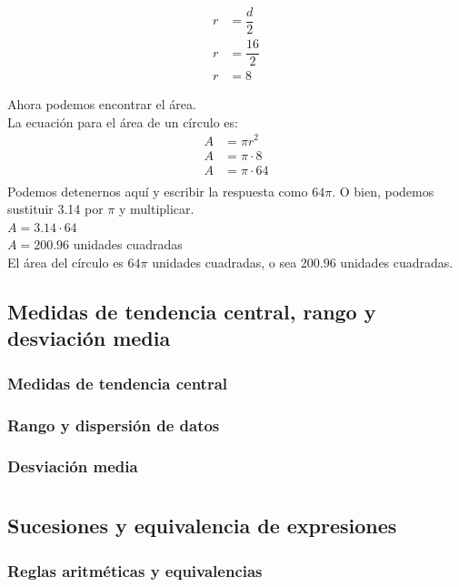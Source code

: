 \documentclass[11pt]{book}
\begin{document}
\begin{align*}
  r & = \dfrac d2     \\
  r & = \dfrac{16}{2} \\
  r & = 8
\end{align*}

Ahora podemos encontrar el área.\\

La ecuación para el área de un círculo es:
\begin{align*}
  A & = \pi r^2      \\
  A & = \pi \cdot 8  \\
  A & = \pi \cdot 64 \\
\end{align*}
Podemos detenernos aquí y escribir la respuesta como $64\pi$. O bien, podemos sustituir 3.14 por $\pi$ y multiplicar.\\
$A = 3.14 \cdot 64$\\
$A = 200.96$ unidades cuadradas\\

El área del círculo es $64\pi$ unidades cuadradas, o sea 200.96 unidades cuadradas.

\section{Medidas de tendencia central, rango y desviación media}
\subsection{Medidas de tendencia central}
\subsection{Rango y dispersi\'on de datos}
\subsection{Desviaci\'on media}


\chapter{}

\section{Sucesiones y equivalencia de expresiones}
\subsection{Reglas aritméticas y equivalencias}
\end{document}
